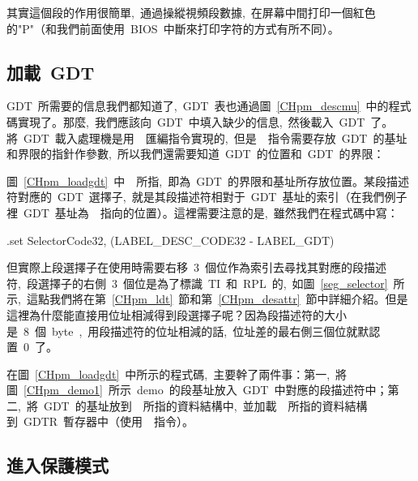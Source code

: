 \label{CHpm_demo1}

其實這個段的作用很簡單,~通過操縱視頻段數據,~在屏幕中間打印一個紅色的"P"（和我們前面使用~BIOS~中斷來打印字符的方式有所不同）。

\subsection{加載~GDT} \label{CHpm_secloadgdt}

GDT~所需要的信息我們都知道了,~GDT~表也通過圖~\ref{CHpm_descmu}~中的程式碼實現了。那麼,~我們應該向~GDT~中填入缺少的信息,~然後載入~GDT~了。將~GDT~載入處理機是用~~匯編指令實現的,~但是~~指令需要存放~GDT~的基址和界限的指針作參數,~所以我們還需要知道~GDT~的位置和~GDT~的界限：

\label{CHpm_loadgdt}

圖~\ref{CHpm_loadgdt}~中~~所指,~即為~GDT~的界限和基址所存放位置。某段描述符對應的~GDT~選擇子,~就是其段描述符相對于~GDT~基址的索引（在我們例子裡~GDT~基址為~~指向的位置）。這裡需要注意的是,~雖然我們在程式碼中寫：

\begin{Command}
.set SelectorCode32, (LABEL_DESC_CODE32 - LABEL_GDT)
\end{Command}
但實際上段選擇子在使用時需要右移~3~個位作為索引去尋找其對應的段描述符,~段選擇子的右側~3~個位是為了標識~TI~和~RPL~的,~如圖~\ref{seg_selector}~所示,~這點我們將在第~\ref{CHpm_ldt}~節和第~\ref{CHpm_desattr}~節中詳細介紹。但是這裡為什麼能直接用位址相減得到段選擇子呢？因為段描述符的大小是~8~個~byte~,~用段描述符的位址相減的話,~位址差的最右側三個位就默認置~0~了。

在圖~\ref{CHpm_loadgdt}~中所示的程式碼,~主要幹了兩件事：第一,~將圖~\ref{CHpm_demo1}~所示~demo~的段基址放入~GDT~中對應的段描述符中；第二,~將~GDT~的基址放到~~所指的資料結構中,~並加載~~所指的資料結構到~GDTR~暫存器中（使用~~指令）。

\subsection{進入保護模式}

